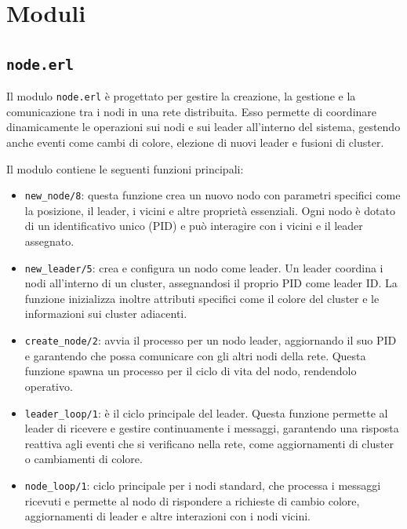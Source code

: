 \documentclass[12pt, a4paper]{report}
\begin{document}
\section{Moduli}

\subsection{\texttt{node.erl}}

Il modulo \texttt{node.erl} è progettato per gestire la creazione, la gestione e la comunicazione tra i nodi in una rete distribuita. Esso permette di coordinare dinamicamente le operazioni sui nodi e sui leader all'interno del sistema, gestendo anche eventi come cambi di colore, elezione di nuovi leader e fusioni di cluster.

Il modulo contiene le seguenti funzioni principali:

\begin{itemize}
    \item \texttt{new\_node/8}: questa funzione crea un nuovo nodo con parametri specifici come la posizione, il leader, i vicini e altre proprietà essenziali. Ogni nodo è dotato di un identificativo unico (PID) e può interagire con i vicini e il leader assegnato.

    \item \texttt{new\_leader/5}: crea e configura un nodo come leader. Un leader coordina i nodi all'interno di un cluster, assegnandosi il proprio PID come leader ID. La funzione inizializza inoltre attributi specifici come il colore del cluster e le informazioni sui cluster adiacenti.

    \item \texttt{create\_node/2}: avvia il processo per un nodo leader, aggiornando il suo PID e garantendo che possa comunicare con gli altri nodi della rete. Questa funzione spawna un processo per il ciclo di vita del nodo, rendendolo operativo.

    \item \texttt{leader\_loop/1}: \`e il ciclo principale del leader. Questa funzione permette al leader di ricevere e gestire continuamente i messaggi, garantendo una risposta reattiva agli eventi che si verificano nella rete, come aggiornamenti di cluster o cambiamenti di colore.

    \item \texttt{node\_loop/1}: ciclo principale per i nodi standard, che processa i messaggi ricevuti e permette al nodo di rispondere a richieste di cambio colore, aggiornamenti di leader e altre interazioni con i nodi vicini.

\end{itemize}
\end{document}
